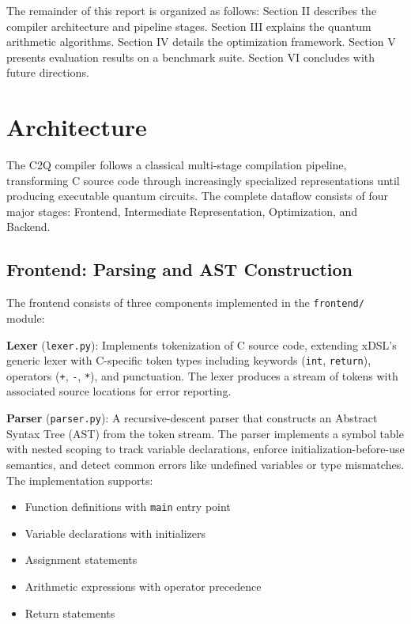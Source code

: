 \documentclass[a4paper,twocolumn]{article}
\begin{document}
The remainder of this report is organized as follows: Section II describes
the compiler architecture and pipeline stages. Section III explains the quantum
arithmetic algorithms. Section IV details the optimization framework. Section V presents
evaluation results on a benchmark suite. Section VI concludes with future directions.
\section{Architecture}

The C2Q compiler follows a classical multi-stage compilation pipeline, transforming C source code through increasingly
specialized representations until producing executable quantum circuits. The complete dataflow consists of four major stages:
Frontend, Intermediate Representation, Optimization, and Backend.

\subsection{Frontend: Parsing and AST Construction}

The frontend consists of three components implemented in the \texttt{frontend/} module:

\textbf{Lexer} (\texttt{lexer.py}): Implements tokenization of C source code, extending xDSL's generic lexer with C-specific
token types including keywords (\texttt{int}, \texttt{return}), operators (\texttt{+}, \texttt{-}, \texttt{*}), and punctuation.
The lexer produces a stream of tokens with associated source locations for error reporting.

\textbf{Parser} (\texttt{parser.py}): A recursive-descent parser that constructs an Abstract Syntax Tree (AST) from the token stream.
The parser implements a symbol table with nested scoping to track variable declarations, enforce initialization-before-use semantics,
and detect common errors like undefined variables or type mismatches. The implementation supports:
\begin{itemize}
  \item Function definitions with \texttt{main} entry point
  \item Variable declarations with initializers
  \item Assignment statements
  \item Arithmetic expressions with operator precedence
  \item Return statements
\end{itemize}
\end{document}

